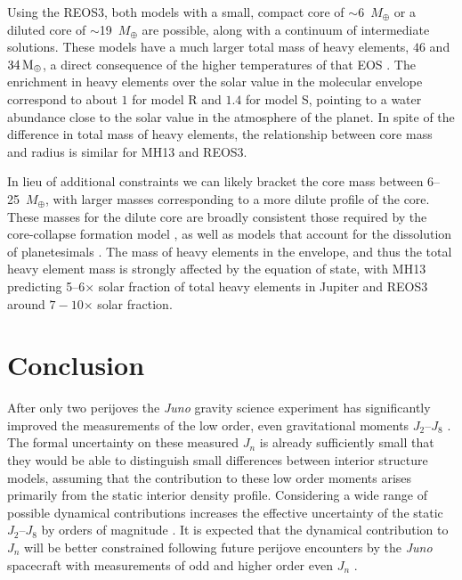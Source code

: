 Using the REOS3, both models with a small, compact core of $\sim$6~$M_\oplus$ or a
diluted core of $\sim$19~$M_\oplus$ are possible, along with a continuum of
intermediate solutions.  These models have a much larger total mass of heavy
elements, $46$ and $34\,\rm M_\oplus$, a direct consequence of the higher
temperatures of that EOS \citep[see][]{miguel2016}.  The enrichment in heavy elements
over the solar value in the molecular envelope correspond to about $1$ for model R
and $1.4$ for model S, pointing to a water abundance close to the solar value in the
atmosphere of the planet.  In spite of the difference in total mass of heavy
elements, the relationship between core mass and radius is similar for MH13 and
REOS3.

In lieu of additional constraints we can likely bracket the core mass between
6--25~$M_\oplus$, with larger masses corresponding to a more dilute profile of
the core. These  masses for the dilute core are broadly consistent those
required by the core-collapse formation model \cite{Pollack1996}, as well as
models  that account for the dissolution of planetesimals \citep{lozovsky2017}.
The mass of heavy elements in the envelope, and thus the total heavy element
mass is strongly affected by the equation of state, with MH13 predicting
5--6$\times$ solar fraction of total heavy elements in Jupiter and REOS3 around 
$7-10$$\times$ solar fraction.


\section{Conclusion} \label{sec:conclusion}

After only two perijoves the \textit{Juno} gravity science experiment has
significantly improved the measurements of the low order, even gravitational
moments $J_2$--$J_8$ \citep{Folkner2017}. The formal uncertainty on these
measured $J_n$ is already sufficiently small that they would be able to
distinguish small differences between interior structure models, assuming that
the contribution to these low order moments arises primarily from the static
interior density profile. Considering a wide range of possible dynamical
contributions increases the effective uncertainty of the static $J_2$--$J_8$ by
orders of magnitude \citep{Kaspi2017}. It is expected that the dynamical
contribution to $J_n$ will be better constrained following future perijove
encounters by the \textit{Juno} spacecraft with measurements of odd and higher
order even $J_n$ \citep{kaspi2013}. 

